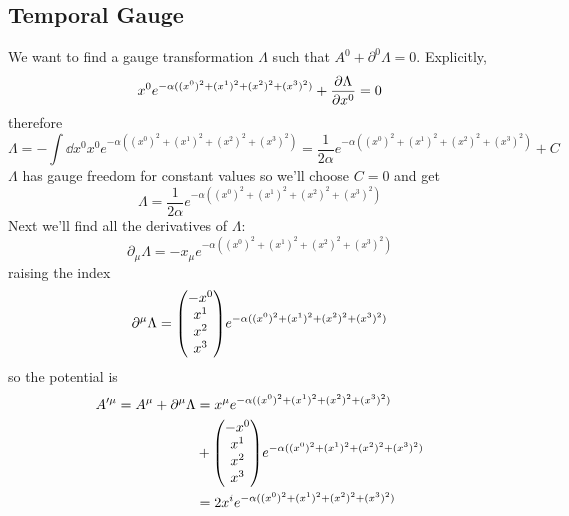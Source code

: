 \subsection{Temporal Gauge}
We want to find a gauge transformation $\Lambda$ such that $A^0+\partial^0\Lambda=0$. Explicitly,
\begin{align}
	x^0e^{-\alpha((x^0)^2+(x^1)^2+(x^2)^2+(x^3)^2)}+\diffp{\Lambda}{x^0} = 0
\end{align}
therefore
\begin{equation}
  \Lambda = -\int \dd x^0 x^0e^{-\alpha((x^0)^2+(x^1)^2+(x^2)^2+(x^3)^2)}=\frac{1}{2\alpha}e^{-\alpha((x^0)^2+(x^1)^2+(x^2)^2+(x^3)^2)}+C
\end{equation}
$\Lambda$ has gauge freedom for constant values so we'll choose $C=0$ and get
\begin{equation}
  \Lambda = \frac{1}{2\alpha}e^{-\alpha((x^0)^2+(x^1)^2+(x^2)^2+(x^3)^2)}
\end{equation}
Next we'll find all the derivatives of $\Lambda$:
\begin{equation}
  \partial_\mu\Lambda = -x_\mu e^{-\alpha((x^0)^2+(x^1)^2+(x^2)^2+(x^3)^2)}
\end{equation}
raising the index
\begin{equation}
  \partial^\mu \Lambda = \mqty(-x^0\\x^1\\x^2\\x^3)e^{-\alpha((x^0)^2+(x^1)^2+(x^2)^2+(x^3)^2)}
\end{equation}
so the potential is
\begin{align}
  A'^\mu=A^\mu+\partial^\mu\Lambda&=x^\mu e^{-\alpha((x^0)^2+(x^1)^2+(x^2)^2+(x^3)^2)}\\
  &+\mqty(-x^0\\x^1\\x^2\\x^3)e^{-\alpha((x^0)^2+(x^1)^2+(x^2)^2+(x^3)^2)}\\
  &=2x^ie^{-\alpha((x^0)^2+(x^1)^2+(x^2)^2+(x^3)^2)}
\end{align}
